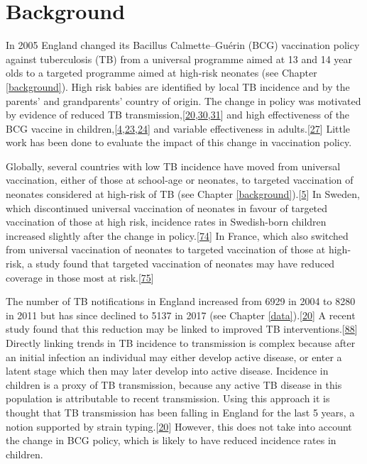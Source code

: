 \documentclass[11pt,twoside]{bristolthesis}
\begin{document}
  \hypertarget{background-5}{%
  \section{Background}\label{background-5}}
  
  In 2005 England changed its Bacillus Calmette--Guérin (BCG) vaccination policy against tuberculosis (TB) from a universal programme aimed at 13 and 14 year olds to a targeted programme aimed at high-risk neonates (see Chapter \ref{background}). High risk babies are identified by local TB incidence and by the parents' and grandparents' country of origin. The change in policy was motivated by evidence of reduced TB transmission,{[}\protect\hyperlink{ref-PHE2016a}{20},\protect\hyperlink{ref-Fine2005a}{30},\protect\hyperlink{ref-Teo2006}{31}{]} and high effectiveness of the BCG vaccine in children,{[}\protect\hyperlink{ref-Roy2014}{4},\protect\hyperlink{ref-Rodrigues1993}{23},\protect\hyperlink{ref-Colditz1994}{24}{]} and variable effectiveness in adults.{[}\protect\hyperlink{ref-Zwerling2011}{27}{]} Little work has been done to evaluate the impact of this change in vaccination policy.
  
  Globally, several countries with low TB incidence have moved from universal vaccination, either of those at school-age or neonates, to targeted vaccination of neonates considered at high-risk of TB (see Chapter \ref{background}).{[}\protect\hyperlink{ref-Zwerling2011a}{5}{]} In Sweden, which discontinued universal vaccination of neonates in favour of targeted vaccination of those at high risk, incidence rates in Swedish-born children increased slightly after the change in policy.{[}\protect\hyperlink{ref-Romanus1992}{74}{]} In France, which also switched from universal vaccination of neonates to targeted vaccination of those at high-risk, a study found that targeted vaccination of neonates may have reduced coverage in those most at risk.{[}\protect\hyperlink{ref-Guthmann2011}{75}{]}
  
  The number of TB notifications in England increased from 6929 in 2004 to 8280 in 2011 but has since declined to 5137 in 2017 (see Chapter \ref{data}).{[}\protect\hyperlink{ref-PHE2016a}{20}{]} A recent study found that this reduction may be linked to improved TB interventions.{[}\protect\hyperlink{ref-Thomas2018}{88}{]} Directly linking trends in TB incidence to transmission is complex because after an initial infection an individual may either develop active disease, or enter a latent stage which then may later develop into active disease. Incidence in children is a proxy of TB transmission, because any active TB disease in this population is attributable to recent transmission. Using this approach it is thought that TB transmission has been falling in England for the last 5 years, a notion supported by strain typing.{[}\protect\hyperlink{ref-PHE2016a}{20}{]} However, this does not take into account the change in BCG policy, which is likely to have reduced incidence rates in children.
  
\end{document}
